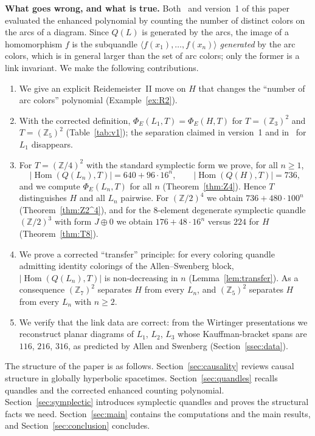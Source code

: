 \documentclass[11pt]{article}
\theoremstyle{definition}
\newcommand{\Z}{\mathbb{Z}}
\newcommand{\Hom}{\operatorname{Hom}}
\newcommand{\PhiE}{\Phi_E}
\newcommand{\gen}[1]{\langle #1 \rangle}
\begin{document}
\medskip
\noindent\textbf{What goes wrong, and what is true.} Both~\cite{Jai24} and version~1 of this paper
evaluated the enhanced polynomial by counting the number of distinct colors on the arcs of a diagram.
Since $Q(L)$ is generated by the arcs, the image of a homomorphism $f$ is the subquandle
$\gen{f(x_1),\dots,f(x_n)}$ \emph{generated} by the arc colors, which is in general larger than the
set of arc colors; only the former is a link invariant. We make the following contributions.
\begin{enumerate}
\item We give an explicit Reidemeister~II move on $H$ that changes the ``number of arc colors''
polynomial (Example~\ref{ex:R2}).
\item With the corrected definition, $\PhiE(L_1,T)=\PhiE(H,T)$ for $T=(\Z_3)^2$ and $T=(\Z_5)^2$
(Table~\ref{tab:v1}); the separation claimed in version~1 and in~\cite{Jai24} for $L_1$ disappears.
\item For $T=(\Z/4)^2$ with the standard symplectic form we prove, for all $n\ge1$,
\[
|\Hom(Q(L_n),T)| = 640+96\cdot16^n,\qquad |\Hom(Q(H),T)|=736,
\]
and we compute $\PhiE(L_n,T)$ for all $n$ (Theorem~\ref{thm:Z4}). Hence $T$ distinguishes $H$ and all
$L_n$ pairwise. For $(\Z/2)^4$ we obtain $736+480\cdot100^n$ (Theorem~\ref{thm:Z2^4}), and for the
$8$-element degenerate symplectic quandle $(\Z/2)^3$ with form $J\oplus0$ we obtain $176+48\cdot16^n$
versus $224$ for $H$ (Theorem~\ref{thm:T8}).
\item We prove a corrected ``transfer'' principle: for every coloring quandle admitting identity
colorings of the Allen--Swenberg block, $|\Hom(Q(L_n),T)|$ is non-decreasing in $n$
(Lemma~\ref{lem:transfer}). As a consequence $(\Z_7)^2$ separates $H$ from every $L_n$, and $(\Z_5)^2$
separates $H$ from every $L_n$ with $n\ge2$.
\item We verify that the link data are correct: from the Wirtinger presentations we reconstruct planar
diagrams of $L_1$, $L_2$, $L_3$ whose Kauffman-bracket spans are $116$, $216$, $316$, as predicted by
Allen and Swenberg (Section~\ref{ssec:data}).
\end{enumerate}

The structure of the paper is as follows. Section~\ref{sec:causality} reviews causal structure in
globally hyperbolic spacetimes. Section~\ref{sec:quandles} recalls quandles and the corrected enhanced
counting polynomial. Section~\ref{sec:symplectic} introduces symplectic quandles and proves the structural
facts we need. Section~\ref{sec:main} contains the computations and the main results, and
Section~\ref{sec:conclusion} concludes.
\end{document}
